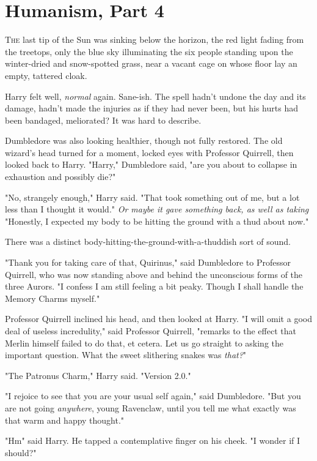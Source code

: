 \chapter{Humanism, Part 4}

\lettrine{T}{he} last tip of
the Sun was sinking below the horizon, the red light fading from the treetops,
only the blue sky illuminating the six people standing upon the winter-dried
and snow-spotted grass, near a vacant cage on whose floor lay an empty,
tattered cloak.

Harry felt{\el} well, \emph{normal} again. Sane-ish. The spell hadn't undone
the day and its damage, hadn't made the injuries as if they had never been, but
his hurts had been{\el} bandaged, meliorated? It was hard to describe.

Dumbledore was also looking healthier, though not fully restored. The old
wizard's head turned for a moment, locked eyes with Professor Quirrell, then
looked back to Harry. "Harry," Dumbledore said, "are you about to collapse in
exhaustion and possibly die?"

"No, strangely enough," Harry said. "That took something out of me, but a lot
less than I thought it would." \emph{Or maybe it gave something back, as well
as taking{\el}} "Honestly, I expected my body to be hitting the ground with
a thud about now."

There was a distinct body-hitting-the-ground-with-a-thuddish sort of sound.

"Thank you for taking care of that, Quirinus," said Dumbledore to Professor
Quirrell, who was now standing above and behind the unconscious forms of the
three Aurors. "I confess I am still feeling a bit peaky. Though I shall handle
the Memory Charms myself."

Professor Quirrell inclined his head, and then looked at Harry. "I will omit a
good deal of useless incredulity," said Professor Quirrell, "remarks to the
effect that Merlin himself failed to do that, et cetera. Let us go straight to
asking the important question. What the sweet slithering snakes was
\emph{that?}"

"The Patronus Charm," Harry said. "Version 2.0."

"I rejoice to see that you are your usual self again," said Dumbledore. "But
you are not going \emph{anywhere}, young Ravenclaw, until you tell me what
exactly was that warm and happy thought."

"Hm{\el}" said Harry. He tapped a contemplative finger on his cheek. "I
wonder if I should?"

